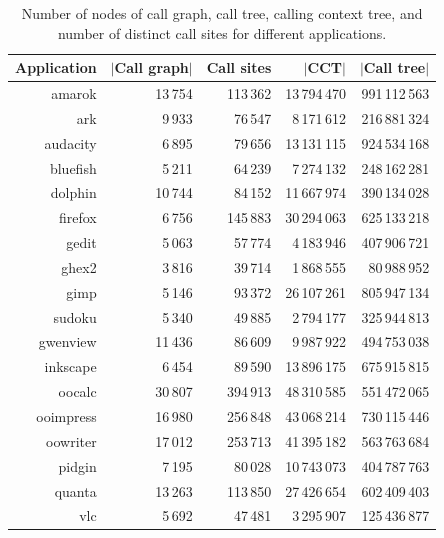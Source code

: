 \documentclass[preprint]{sigplanconf}
\begin{document}
\begin{table}[t]
\caption{Number of nodes of call graph, call tree, calling context tree, and number of distinct call sites for different applications.}
\centering
\begin{small}
\begin{tabular}{r r r r r}
\hline\hline
Application & $|$Call graph$|$ & Call sites & $|$CCT$|$ & $|$Call tree$|$\\
\hline
amarok & 13\,754 & 113\,362 & 13\,794\,470 & 991\,112\,563 \\
ark & 9\,933 & 76\,547 & 8\,171\,612 & 216\,881\,324 \\
audacity & 6\,895 & 79\,656 & 13\,131\,115 & 924\,534\,168 \\
bluefish & 5\,211 & 64\,239 & 7\,274\,132 & 248\,162\,281 \\
dolphin & 10\,744 & 84\,152 & 11\,667\,974 & 390\,134\,028 \\
firefox & 6\,756 & 145\,883 & 30\,294\,063 & 625\,133\,218 \\
gedit & 5\,063 & 57\,774 & 4\,183\,946 & 407\,906\,721 \\
ghex2 & 3\,816 & 39\,714 & 1\,868\,555 & 80\,988\,952 \\
gimp & 5\,146 & 93\,372 & 26\,107\,261 & 805\,947\,134 \\
sudoku & 5\,340 & 49\,885 & 2\,794\,177 & 325\,944\,813 \\
gwenview & 11\,436 & 86\,609 & 9\,987\,922 & 494\,753\,038 \\
inkscape & 6\,454 & 89\,590 & 13\,896\,175 & 675\,915\,815 \\
oocalc & 30\,807 & 394\,913 & 48\,310\,585 & 551\,472\,065 \\
ooimpress & 16\,980 & 256\,848 & 43\,068\,214 & 730\,115\,446 \\
oowriter & 17\,012 & 253\,713 & 41\,395\,182 & 563\,763\,684 \\
pidgin & 7\,195 & 80\,028 & 10\,743\,073 & 404\,787\,763 \\
quanta & 13\,263 & 113\,850 & 27\,426\,654 & 602\,409\,403 \\
vlc & 5\,692 & 47\,481 & 3\,295\,907 & 125\,436\,877 \\
\hline
\end{tabular}
\end{small}
\label{tab:CCTsize}
\end{table}
\end{document}
